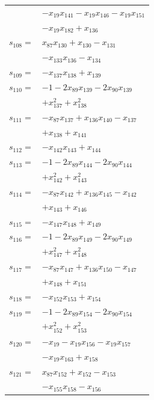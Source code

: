 \begin{longtable}{@{}r@{\;}l@{}}
 & \(\displaystyle -x_{19}x_{141} -x_{19}x_{146} -x_{19}x_{151}\) \\
 & \(\displaystyle -x_{19}x_{182} +x_{136}\) \\[3pt]
\(s_{108}=\) & \(\displaystyle x_{87}x_{130} +x_{130} -x_{131}\) \\
 & \(\displaystyle -x_{133}x_{136} -x_{134}\) \\[3pt]
\(s_{109}=\) & \(\displaystyle -x_{137}x_{138} +x_{139}\) \\[3pt]
\(s_{110}=\) & \(\displaystyle -1 -2x_{89}x_{139} -2x_{90}x_{139}\) \\
 & \(\displaystyle +x_{137}^{2} +x_{138}^{2}\) \\[3pt]
\(s_{111}=\) & \(\displaystyle -x_{87}x_{137} +x_{136}x_{140} -x_{137}\) \\
 & \(\displaystyle +x_{138} +x_{141}\) \\[3pt]
\(s_{112}=\) & \(\displaystyle -x_{142}x_{143} +x_{144}\) \\[3pt]
\(s_{113}=\) & \(\displaystyle -1 -2x_{89}x_{144} -2x_{90}x_{144}\) \\
 & \(\displaystyle +x_{142}^{2} +x_{143}^{2}\) \\[3pt]
\(s_{114}=\) & \(\displaystyle -x_{87}x_{142} +x_{136}x_{145} -x_{142}\) \\
 & \(\displaystyle +x_{143} +x_{146}\) \\[3pt]
\(s_{115}=\) & \(\displaystyle -x_{147}x_{148} +x_{149}\) \\[3pt]
\(s_{116}=\) & \(\displaystyle -1 -2x_{89}x_{149} -2x_{90}x_{149}\) \\
 & \(\displaystyle +x_{147}^{2} +x_{148}^{2}\) \\[3pt]
\(s_{117}=\) & \(\displaystyle -x_{87}x_{147} +x_{136}x_{150} -x_{147}\) \\
 & \(\displaystyle +x_{148} +x_{151}\) \\[3pt]
\(s_{118}=\) & \(\displaystyle -x_{152}x_{153} +x_{154}\) \\[3pt]
\(s_{119}=\) & \(\displaystyle -1 -2x_{89}x_{154} -2x_{90}x_{154}\) \\
 & \(\displaystyle +x_{152}^{2} +x_{153}^{2}\) \\[3pt]
\(s_{120}=\) & \(\displaystyle -x_{19} -x_{19}x_{156} -x_{19}x_{157}\) \\
 & \(\displaystyle -x_{19}x_{163} +x_{158}\) \\[3pt]
\(s_{121}=\) & \(\displaystyle x_{87}x_{152} +x_{152} -x_{153}\) \\
 & \(\displaystyle -x_{155}x_{158} -x_{156}\) \\[3pt]

\end{longtable}
